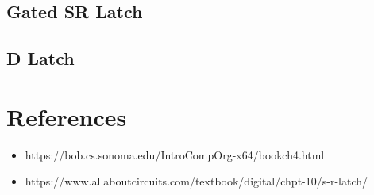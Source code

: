 \subsection{Gated SR Latch}

\subsection{D Latch}

\section{References}

\begin{itemize}
	\item https://bob.cs.sonoma.edu/IntroCompOrg-x64/bookch4.html
	\item https://www.allaboutcircuits.com/textbook/digital/chpt-10/s-r-latch/
\end{itemize}